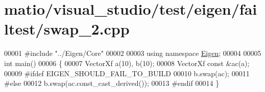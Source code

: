 \hypertarget{matio_2visual__studio_2test_2eigen_2failtest_2swap__2_8cpp_source}{}\section{matio/visual\+\_\+studio/test/eigen/failtest/swap\+\_\+2.cpp}
\label{matio_2visual__studio_2test_2eigen_2failtest_2swap__2_8cpp_source}

\begin{DoxyCode}
00001 \textcolor{preprocessor}{#include "../Eigen/Core"}
00002 
00003 \textcolor{keyword}{using namespace }\hyperlink{namespace_eigen}{Eigen};
00004 
00005 \textcolor{keywordtype}{int} main()
00006 \{
00007   VectorXf a(10), b(10);
00008   VectorXf \textcolor{keyword}{const} &ac(a);
00009 \textcolor{preprocessor}{#ifdef EIGEN\_SHOULD\_FAIL\_TO\_BUILD}
00010   b.swap(ac);
00011 \textcolor{preprocessor}{#else}
00012   b.swap(ac.const\_cast\_derived());
00013 \textcolor{preprocessor}{#endif}
00014 \textcolor{preprocessor}{\}}
\end{DoxyCode}
